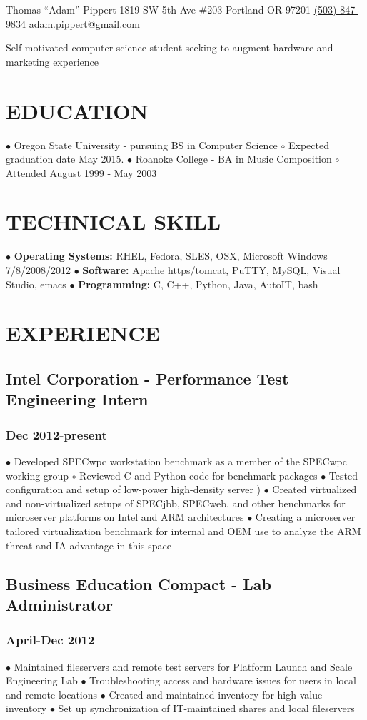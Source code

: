 \documentclass{article}
\begin{document}
Thomas ``Adam'' Pippert
1819 SW 5th Ave \#203
Portland OR 97201
\href{tel:+15038479834}{(503) 847-9834}
\href{mailto:adam.pippert@gmail.com}{adam.pippert@gmail.com}

Self-motivated computer science student seeking to augment hardware and marketing experience

\section*{EDUCATION}

$\bullet$ Oregon State University - pursuing BS in Computer Science
$  \circ$ Expected graduation date May 2015.
$\bullet$ Roanoke College - BA in Music Composition
$  \circ$ Attended August 1999 - May 2003

\section*{TECHNICAL SKILL}

$\bullet$ \textbf{Operating Systems:} RHEL, Fedora, SLES, OSX, Microsoft Windows 7/8/2008/2012
$\bullet$ \textbf{Software:} Apache https/tomcat, PuTTY, MySQL, Visual Studio, emacs
$\bullet$ \textbf{Programming:} C, C++, Python, Java, AutoIT, bash

\section*{EXPERIENCE}

\subsection*{Intel Corporation - Performance Test Engineering Intern}
\subsubsection*{Dec 2012-present}

$\bullet$ Developed SPECwpc workstation benchmark as a member of the SPECwpc working group
$  \circ$ Reviewed C and Python code for benchmark packages
$\bullet$ Tested configuration and setup of low-power high-density server )
$\bullet$ Created virtualized and non-virtualized setups of SPECjbb, SPECweb, and other benchmarks for microserver platforms on Intel and ARM architectures
$\bullet$ Creating a microserver tailored virtualization benchmark for internal and OEM use to analyze the ARM threat and IA advantage in this space

\subsection*{Business Education Compact - Lab Administrator}
\subsubsection*{April-Dec 2012}

$\bullet$ Maintained fileservers and remote test servers for Platform Launch and Scale Engineering Lab
$\bullet$ Troubleshooting access and hardware issues for users in local and remote locations
$\bullet$ Created and maintained inventory for high-value inventory
$\bullet$ Set up synchronization of IT-maintained shares and local fileservers
\end{document}
